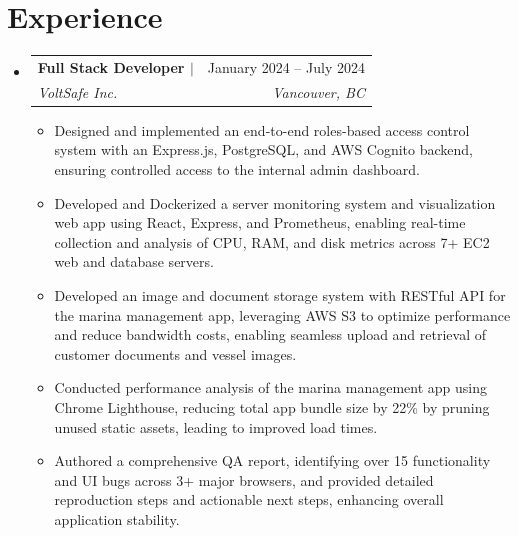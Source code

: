 \documentclass[letterpaper]{article}
\makeatletter
\newcommand{\resumeItem}[1]{
  \item\small{
    {#1 \vspace{-2pt}}
  }
}
\newcommand{\resumeSubheading}[4]{
  \vspace{-2pt}\item
    \begin{tabular*}{0.97\textwidth}[t]{l@{\extracolsep{\fill}}r}
      \textbf{#1} & #2 \\
      \textit{\small#3} & \textit{\small #4} \\
    \end{tabular*}\vspace{-7pt}
}
\newcommand{\resumeSubHeadingListStart}{\begin{itemize}[leftmargin=0.15in, label={}]}
\newcommand{\resumeSubHeadingListEnd}{\end{itemize}}
\newcommand{\resumeItemListStart}{\begin{itemize}}
\newcommand{\resumeItemListEnd}{\end{itemize}\vspace{-5pt}}
\makeatother
\begin{document}
\section{Experience}
\color{black}
  \resumeSubHeadingListStart
    \resumeSubheading
      {Full Stack Developer $|$ \normalfont{React, TypeScript, Express.js, PostgreSQL, AWS}}{January 2024 -- July 2024}
      {VoltSafe Inc.} {Vancouver, BC}
        \resumeItemListStart
          \resumeItem{Designed and implemented an end-to-end roles-based access control system with an Express.js, PostgreSQL, and AWS Cognito backend, ensuring controlled access to the internal admin dashboard.}
          \resumeItem{Developed and Dockerized a server monitoring system and visualization web app using React, Express, and Prometheus, enabling real-time collection and analysis of CPU, RAM, and disk metrics across 7+ EC2 web and database servers.}
          \resumeItem{Developed an image and document storage system with RESTful API for the marina management app, leveraging AWS S3 to optimize performance and reduce bandwidth costs, enabling seamless upload and retrieval of customer documents and vessel images.}
					\resumeItem{Conducted performance analysis of the marina management app using Chrome Lighthouse, reducing total app bundle size by 22\% by pruning unused static assets, leading to improved load times.}
					\resumeItem{Authored a comprehensive QA report, identifying over 15 functionality and UI bugs across 3+ major browsers, and provided detailed reproduction steps and actionable next steps, enhancing overall application stability.}
        \resumeItemListEnd


  \resumeSubHeadingListEnd
  
\end{document}
